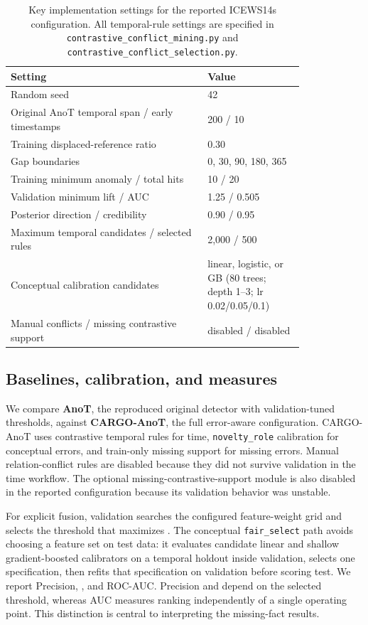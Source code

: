 \begin{table}[t]
\centering
\caption{Key implementation settings for the reported ICEWS14s configuration. All temporal-rule settings are specified in \texttt{contrastive\_conflict\_mining.py} and \texttt{contrastive\_conflict\_selection.py}.}
\label{tab:implementation}
\small
\begin{tabular}{@{}p{0.55\linewidth}p{0.27\linewidth}@{}}
\toprule
Setting & Value \\
\midrule
Random seed & 42 \\
Original AnoT temporal span / early timestamps & 200 / 10 \\
Training displaced-reference ratio & 0.30 \\
Gap boundaries & 0, 30, 90, 180, 365 \\
Training minimum anomaly / total hits & 10 / 20 \\
Validation minimum lift / AUC & 1.25 / 0.505 \\
Posterior direction / credibility & 0.90 / 0.95 \\
Maximum temporal candidates / selected rules & 2,000 / 500 \\
Conceptual calibration candidates & linear, logistic, or GB (80 trees; depth 1--3; lr 0.02/0.05/0.1) \\
Manual conflicts / missing contrastive support & disabled / disabled \\
\bottomrule
\end{tabular}
\end{table}

\subsection{Baselines, calibration, and measures}

We compare \textbf{AnoT}, the reproduced original detector with validation-tuned thresholds, against \textbf{CARGO-AnoT}, the full error-aware configuration. CARGO-AnoT uses contrastive temporal rules for time, \texttt{novelty\_role} calibration for conceptual errors, and train-only missing support for missing errors. Manual relation-conflict rules are disabled because they did not survive validation in the time workflow. The optional missing-contrastive-support module is also disabled in the reported configuration because its validation behavior was unstable.

For explicit fusion, validation searches the configured feature-weight grid and selects the threshold that maximizes \fbeta. The conceptual \texttt{fair\_select} path avoids choosing a feature set on test data: it evaluates candidate linear and shallow gradient-boosted calibrators on a temporal holdout inside validation, selects one specification, then refits that specification on validation before scoring test. We report Precision, \fbeta, and ROC-AUC. Precision and \fbeta depend on the selected threshold, whereas AUC measures ranking independently of a single operating point. This distinction is central to interpreting the missing-fact results.

